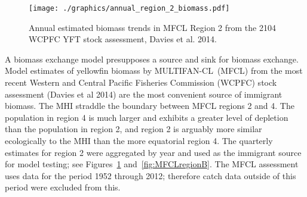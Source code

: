 \documentclass[12pt,letterpaper,twoside]{article}
\newcommand\MFCL{MULTIFAN-CL}
\begin{document}
\begin{figure}
\begin{center}
\texttt{[image: ./graphics/annual\_region\_2\_biomass.pdf]}
\caption{\label{fig:r2biomass}
Annual estimated biomass trends in MFCL Region 2 from the 2104 WCPFC YFT
stock assessment, Davies et al. 2014.
}
\end{center}
\end{figure}
A biomass exchange model presupposes a source and sink for biomass
exchange.
Model estimates of yellowfin biomass by \MFCL\ (MFCL)
from the most recent Western and Central Pacific Fisheries Commission
(WCPFC) stock assessment (Davies et al 2014) 
are the most convenient source of immigrant biomass. 
The MHI straddle the boundary between MFCL regions 2 and 4.
The population in region 4 is much larger and exhibits a greater level
of depletion than the population in region 2, and region 2 is arguably
more similar ecologically to the MHI than the more equatorial region 4.
The quarterly estimates for
region 2 were aggregated by year and used as the immigrant source for
model testing; see Figures~\ref{fig:r2biomass} and~\ref{fig:MFCLregionB}.
The MFCL assessment uses data for the period 1952 through 2012;
therefore catch data outside of this period were excluded
from this.
\end{document}

